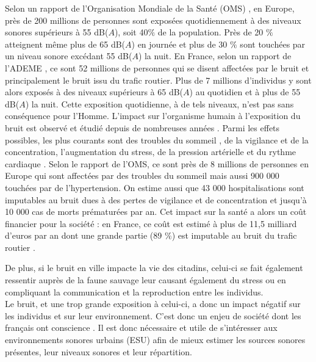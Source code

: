 Selon un rapport de l'Organisation Mondiale de la Santé (OMS) \cite{who_burden_2017}, en Europe, près de 200 millions de personnes sont exposées quotidiennement à des niveaux sonores supérieurs à 55 dB($A$), soit 40$\%$ de la population. Près de 20 $\%$ atteignent même plus de 65 dB($A$) en journée et plus de 30 $\%$ sont touchées par un niveau sonore excédant 55 dB($A$) la nuit. En France, selon un rapport de l'ADEME \cite{europeens2016analyse}, ce sont 52 millions de personnes qui se disent affectées par le bruit et principalement le bruit issu du trafic routier. Plus de 7 millions d'individus y sont alors exposés à des niveaux supérieurs à 65 dB($A$) au quotidien et à plus de 55 dB($A$) la nuit.
Cette exposition quotidienne, à de tels niveaux, n'est pas sans conséquence pour l'Homme. L'impact sur l'organisme humain à l'exposition du bruit est observé et étudié depuis de nombreuses années \cite{ising1980health}. Parmi les effets possibles, les plus courants sont des troubles du sommeil \cite{pirrera2010nocturnal}, de la vigilance et de la concentration, l'augmentation du stress, de la pression artérielle et du rythme cardiaque \cite{babisch2008road, babisch2005traffic}. Selon le rapport de l'OMS, ce sont près de 8 millions de personnes en Europe qui sont affectées par des troubles du sommeil mais aussi 900 000 touchées par de l'hypertension. On estime aussi que 43 000 hospitalisations sont imputables au bruit dues à des pertes de vigilance et de concentration et jusqu'à 10 000 cas de morts prématurées par an. Cet impact sur la santé a alors un coût financier pour la société : en France, ce coût est estimé à plus de 11,5 milliard d'euros par an dont une grande partie (89 $\%$) est imputable au bruit du trafic routier \cite{europeens2016analyse}. 

De plus, si le bruit en ville impacte la vie des citadins, celui-ci se fait également ressentir auprès de la faune sauvage \cite{dutilleux_anthropogenic_2012, francis2009noise} leur causant également du stress ou en compliquant la communication et la reproduction entre les individus.\\

Le bruit, et une trop grande exposition à celui-ci, a donc un impact négatif sur les individus et sur leur environnement. C'est donc un enjeu de société dont les français ont conscience \cite{JNA2016etude}. 
Il est donc nécessaire et utile de s'intéresser aux environnements sonores urbains (ESU) afin de mieux estimer les sources sonores présentes, leur niveaux sonores et leur répartition.

